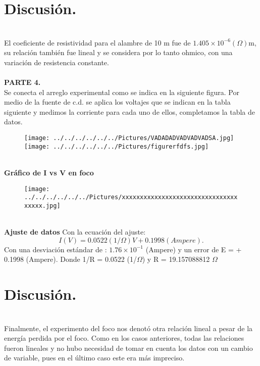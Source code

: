 \documentclass[11pt,a4paper]{article}
\begin{document}
\section*{Discusi\'{o}n.}\\
El coeficiente de resistividad para el alambre de 10 m fue de $1.405\times {10}^{-6} (\Omega)$m, su relaci\'{o}n tambi\'{e}n fue lineal y se considera por lo tanto ohmico, con una variaci\'{o}n de resistencia constante.
\\
\pagebreak
\\
\textbf{PARTE 4.}
\\
Se conecta el arreglo experimental como se indica en la siguiente figura. Por medio de la fuente de c.d. se aplica los voltajes que se indican en la tabla siguiente y medimos la corriente para cada uno de ellos, completamos la tabla de datos.
\\
\begin{figure}[hbtp]
 \centering
 \texttt{[image: ../../../../../../Pictures/VADADADVADVADVADSA.jpg]}
 \texttt{[image: ../../../../../../Pictures/figurerfdfs.jpg]}
 \end{figure}
\\
\textbf{Gr\'{a}fico de I vs V en foco}
\begin{figure}[hbtp]
\centering
\texttt{[image: ../../../../../../Pictures/xxxxxxxxxxxxxxxxxxxxxxxxxxxxxxxxxxxxx.jpg]}
\end{figure}\\
\textbf{Ajuste de datos} Con la ecuaci\'{o}n del ajuste: 
\[I(V) = 0.0522(1/\Omega)V + 0.1998 (Ampere).\]
Con una desviaci\'{o}n est\'{a}ndar de : $1.76\times {10}^{-1}$ (Ampere) y un error de E = + 0.1998 (Ampere). Donde 1/R = 0.0522 (1/$\Omega$) y R = 19.157088812 $\Omega$
\section*{Discusi\'{o}n.}\\
Finalmente, el experimento del foco nos denot\'{o} otra relaci\'{o}n lineal a pesar de la energ\'{i}a perdida por el foco. Como en los casos anteriores, todas las relaciones fueron lineales y no hubo necesidad de tomar en cuenta los datos con un cambio de variable, pues en el \'{u}ltimo caso este era m\'{a}s impreciso.
\end{document}

